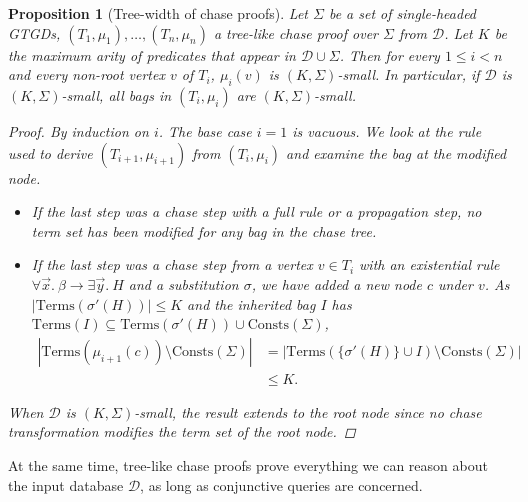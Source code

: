 \documentclass[12pt]{report}
\theoremstyle{plain}
\newtheorem{proposition}[theorem]{Proposition}
\theoremstyle{definition}
\def\Consts{{\mathrm{Consts}}}
\def\Terms{{\mathrm{Terms}}}
\begin{document}
\begin{proposition}[Tree-width of chase proofs]
\label{chase-proofs-tree-width}
  Let $\Sigma$ be a set of \emph{single-headed} GTGDs, $(T_1, \mu_1), \ldots, (T_n, \mu_n)$ a tree-like chase proof over $\Sigma$ from $\mathcal{D}$. Let $K$ be the maximum arity of predicates that appear in $\mathcal{D} \cup \Sigma$. Then for every $1 \leq i < n$ and every non-root vertex $v$ of $T_i$, $\mu_i(v)$ is $(K, \Sigma)$-small. In particular, if $\mathcal{D}$ is $(K, \Sigma)$-small, all bags in $(T_i, \mu_i)$ are $(K, \Sigma)$-small.
  \begin{proof}
    By induction on $i$. The base case $i = 1$ is vacuous. We look at the rule used to derive $(T_{i+1}, \mu_{i+1})$ from $(T_{i}, \mu_{i})$ and examine the bag at the modified node.
    \begin{itemize}
      \item If the last step was a chase step with a full rule or a propagation step, no term set has been modified for any bag in the chase tree.
      \item If the last step was a chase step from a vertex $v \in T_i$ with an existential rule $\forall \vec{x}.\ \beta \rightarrow \exists \vec{y}.\ H$ and a substitution $\sigma$, we have added a new node $c$ under $v$. As $|\Terms(\sigma'(H))| \leq K$ and the inherited bag $I$ has $\Terms(I) \subseteq \Terms(\sigma'(H)) \cup \Consts(\Sigma)$,
      \begin{equation*}
        \begin{split}
          |\Terms(\mu_{i+1}(c)) \setminus \Consts(\Sigma)|
            &= |\Terms(\{\sigma'(H)\} \cup I) \setminus \Consts(\Sigma)| \\
            &\leq K.
        \end{split}
      \end{equation*}
    \end{itemize}
    When $\mathcal{D}$ is $(K, \Sigma)$-small, the result extends to the root node since no chase transformation modifies the term set of the root node.
  \end{proof}
\end{proposition}

At the same time, tree-like chase proofs prove everything we can reason about the input database $\mathcal{D}$, as long as conjunctive queries are concerned.
\end{document}
